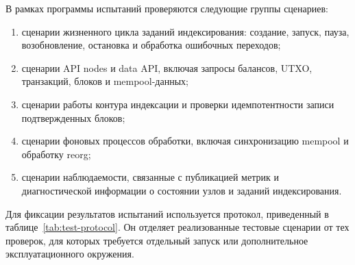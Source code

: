 В рамках программы испытаний проверяются следующие группы сценариев:
\begin{enumerate}
    \item сценарии жизненного цикла заданий индексирования: создание, запуск, пауза,
    возобновление, остановка и обработка ошибочных переходов;
    \item сценарии API nodes и data API, включая запросы балансов, UTXO,
    транзакций, блоков и mempool-данных;
    \item сценарии работы контура индексации и проверки идемпотентности
    записи подтвержденных блоков;
    \item сценарии фоновых процессов обработки, включая синхронизацию mempool и обработку reorg;
    \item сценарии наблюдаемости, связанные с публикацией метрик и
    диагностической информации о состоянии узлов и заданий индексирования.
\end{enumerate}

Для фиксации результатов испытаний используется протокол, приведенный в
таблице~\ref{tab:test-protocol}. Он отделяет реализованные тестовые сценарии
от тех проверок, для которых требуется отдельный запуск или дополнительное
эксплуатационного окружения.

